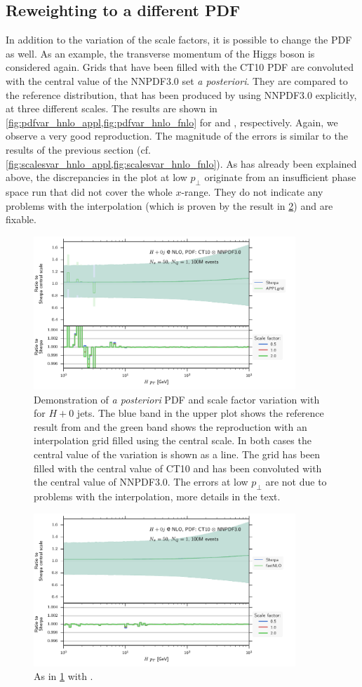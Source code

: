 \subsection{Reweighting to a different PDF}
In addition to the variation of the scale factors, it is possible to change the PDF as well.
As an example, the transverse momentum of the Higgs boson is considered again.
Grids that have been filled with the CT10 PDF are convoluted with the central value of the NNPDF3.0 set \textit{a posteriori}.
They are compared to the reference distribution, that has been produced by \sherpa{} using NNPDF3.0 explicitly, at three different scales.
The results are shown in \cref{fig:pdfvar_hnlo_appl,fig:pdfvar_hnlo_fnlo} for \appl{} and \fnlo{}, respectively.
Again, we observe a very good reproduction.
The magnitude of the errors is similar to the results of the previous section (cf. \cref{fig:scalesvar_hnlo_appl,fig:scalesvar_hnlo_fnlo}).
As has already been explained above, the discrepancies in the \appl{} plot at low $p_\perp$ originate from an insufficient phase space run that did not cover the whole $x$-range.
They do not indicate any problems with the interpolation (which is proven by the \fnlo{} result in \cref{fig:pdfvar_hnlo_fnlo}) and are fixable.
%
\begin{figure}
	\centering
	\includegraphics[width=0.88\textwidth]{images/pdfvar_hnlo_appl.pdf}
	\caption{Demonstration of \textit{a posteriori} PDF and scale factor variation with \appl{} for $H + 0$ jets.
			The blue band in the upper plot shows the reference result from \sherpa{} and the green band shows the reproduction with an interpolation grid filled using the central scale.
			In both cases the central value of the variation is shown as a line.
			The grid has been filled with the central value of CT10 and has been convoluted with the central value of NNPDF3.0.
			The errors at low $p_\perp$ are not due to problems with the interpolation, more details in the text.}
	\label{fig:pdfvar_hnlo_appl}
\end{figure}
%
\begin{figure}
	\centering
	\includegraphics[width=0.88\textwidth]{images/pdfvar_hnlo_fnlo.pdf}
	\caption{As in \cref{fig:pdfvar_hnlo_appl} with \fnlo{}.}
	\label{fig:pdfvar_hnlo_fnlo}
\end{figure}
%
